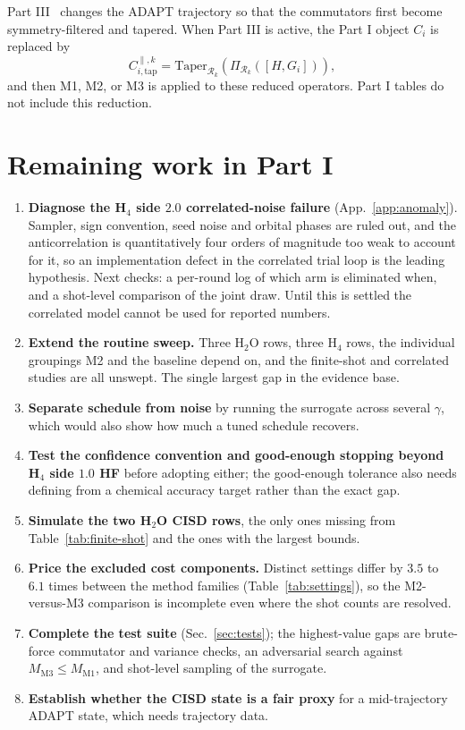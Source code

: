 \documentclass[10pt]{article}
\begin{document}
Part III~\cite{PartIII} changes the ADAPT trajectory so that the commutators first become symmetry-filtered and tapered. When Part III is active, the Part I object $C_i$ is replaced by
\begin{equation}
  C_{i,\mathrm{tap}}^{\parallel,k}
  =\mathrm{Taper}_{\mathcal R_k}\left(\Pi_{\mathcal R_k}([H,G_i])\right),
\end{equation}
and then M1, M2, or M3 is applied to these reduced operators. Part I tables do not include this reduction.

\section{Remaining work in Part I}
\label{sec:remaining}

\begin{enumerate}[leftmargin=2em]
  \item \textbf{Diagnose the H$_4$ side $2.0$ correlated-noise failure} (App.~\ref{app:anomaly}). Sampler, sign convention, seed noise and orbital phases are ruled out, and the anticorrelation is quantitatively four orders of magnitude too weak to account for it, so an implementation defect in the correlated trial loop is the leading hypothesis. Next checks: a per-round log of which arm is eliminated when, and a shot-level comparison of the joint draw. Until this is settled the correlated model cannot be used for reported numbers.
  \item \textbf{Extend the routine sweep.} Three H$_2$O rows, three H$_4$ rows, the individual groupings M2 and the baseline depend on, and the finite-shot and correlated studies are all unswept. The single largest gap in the evidence base.
  \item \textbf{Separate schedule from noise} by running the surrogate across several $\gamma$, which would also show how much a tuned schedule recovers.
  \item \textbf{Test the confidence convention and good-enough stopping beyond H$_4$ side $1.0$ HF} before adopting either; the good-enough tolerance also needs defining from a chemical accuracy target rather than the exact gap.
  \item \textbf{Simulate the two H$_2$O CISD rows}, the only ones missing from Table~\ref{tab:finite-shot} and the ones with the largest bounds.
  \item \textbf{Price the excluded cost components.} Distinct settings differ by $3.5$ to $6.1$ times between the method families (Table~\ref{tab:settings}), so the M2-versus-M3 comparison is incomplete even where the shot counts are resolved.
  \item \textbf{Complete the test suite} (Sec.~\ref{sec:tests}); the highest-value gaps are brute-force commutator and variance checks, an adversarial search against $M_{\mathrm{M3}}\le M_{\mathrm{M1}}$, and shot-level sampling of the surrogate.
  \item \textbf{Establish whether the CISD state is a fair proxy} for a mid-trajectory ADAPT state, which needs trajectory data.
\end{enumerate}
\end{document}
